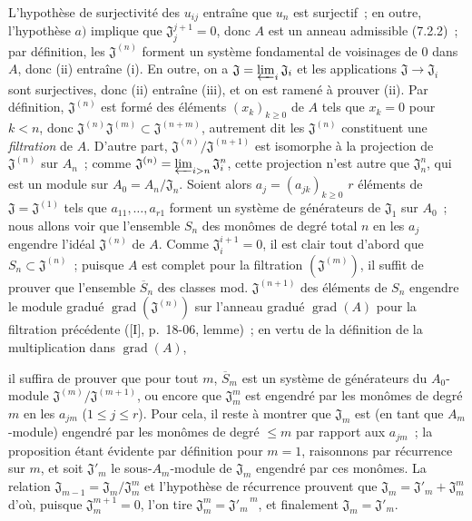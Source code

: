L'hypothèse de surjectivité des $u_{ij}$ entraîne que $u_n$ est surjectif~;
en outre, l'hypothèse $a)$ implique que $\mathfrak J_j^{j+1}=0$, donc $A$ est
un anneau admissible (7.2.2)~; par définition, les $\mathfrak J^{(n)}$ forment
un système fondamental de voisinages de $0$ dans $A$, donc (ii) entraîne (i).
En outre, on a $\mathfrak J=\varprojlim_i\mathfrak J_i$ et les applications
$\mathfrak J\to\mathfrak J_i$ sont surjectives, donc (ii) entraîne (iii), et
on est ramené à prouver (ii). Par définition, $\mathfrak J^{(n)}$ est formé
des éléments $(x_k)_{k\geq0}$ de $A$ tels que $x_k=0$ pour $k<n$, donc
$\mathfrak J^{(n)}\mathfrak J^{(m)}\subset\mathfrak J^{(n+m)}$, autrement dit
les $\mathfrak J^{(n)}$ constituent une \emph{filtration} de $A$. D'autre
part, $\mathfrak J^{(n)}/\mathfrak J^{(n+1)}$ est isomorphe à la projection de
$\mathfrak J^{(n)}$ sur $A_n$~; comme
$\mathfrak J^{(n)}=\varprojlim_{i>n}\mathfrak J_i^n$, cette projection n'est
autre que $\mathfrak J_n^n$, qui est un module sur
$A_0=A_n/\mathfrak J_n$. Soient alors $a_j=(a_{jk})_{k\geq0}$ $r$ éléments de
$\mathfrak J=\mathfrak J^{(1)}$ tels que $a_{11},\ldots,a_{r1}$ forment un
système de générateurs de $\mathfrak J_1$ sur $A_0$~; nous allons voir que
l'ensemble $S_n$ des monômes de degré total $n$ en les $a_j$ engendre l'idéal
$\mathfrak J^{(n)}$ de $A$. Comme $\mathfrak J_i^{i+1}=0$, il est clair tout
d'abord que $S_n\subset\mathfrak J^{(n)}$~; puisque $A$ est complet pour la
filtration $(\mathfrak J^{(m)})$, il suffit de prouver que l'ensemble
$\overline S_n$ des classes mod. $\mathfrak J^{(n+1)}$ des éléments de $S_n$
engendre le module gradué $\operatorname{grad}(\mathfrak J^{(n)})$ sur
l'anneau gradué $\operatorname{grad}(A)$ pour la filtration précédente
([I], p.~18-06, lemme)~; en vertu de la définition de la multiplication dans
$\operatorname{grad}(A)$,


il suffira de prouver que pour tout $m$, $\overline S_m$ est un système de
générateurs du $A_0$-module
$\mathfrak J^{(m)}/\mathfrak J^{(m+1)}$, ou encore que $\mathfrak J_m^m$ est
engendré par les monômes de degré $m$ en les $a_{jm}$ ($1\leq j\leq r$).
Pour cela, il reste à montrer que $\mathfrak J_m$ est (en tant que
$A_m$-module) engendré par les monômes de degré $\leq m$ par rapport aux
$a_{jm}$~; la proposition étant évidente par définition pour $m=1$,
raisonnons par récurrence sur $m$, et soit $\mathfrak J'_m$ le sous-$A_m$-module
de $\mathfrak J_m$ engendré par ces monômes. La relation
$\mathfrak J_{m-1}=\mathfrak J_m/\mathfrak J_m^m$ et l'hypothèse de récurrence
prouvent que $\mathfrak J_m=\mathfrak J'_m+\mathfrak J_m^m$ d'où, puisque
$\mathfrak J_m^{m+1}=0$, l'on tire
$\mathfrak J_m^m={\mathfrak J'_m}^{\,m}$, et finalement
$\mathfrak J_m=\mathfrak J'_m$.

